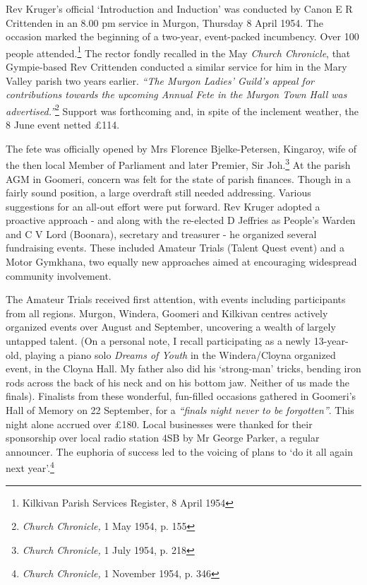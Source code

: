 Rev Kruger's official `Introduction and Induction' was conducted by Canon E R Crittenden in an 8.00 pm service in Murgon, Thursday 8 April 1954. The occasion marked the beginning of a two-year, event-packed incumbency. Over 100 people attended.\footnote{Kilkivan Parish Services Register, 8 April 1954} The rector fondly recalled in the May \emph{Church Chronicle}, that Gympie-based Rev Crittenden conducted a similar service for him in the Mary Valley parish two years earlier. \emph{``The Murgon Ladies' Guild's appeal for contributions towards the upcoming Annual Fete in the Murgon Town Hall was advertised.''}\footnote{\emph{Church Chronicle,} 1 May 1954, p. 155} Support was forthcoming and, in spite of the inclement weather, the 8 June event netted \pounds114.


The fete was officially opened by Mrs Florence Bjelke-Petersen, Kingaroy, wife of the then local Member of Parliament and later Premier, Sir Joh.\footnote{\emph{Church Chronicle,} 1 July 1954, p. 218} At the parish AGM in Goomeri, concern was felt for the state of parish finances. Though in a fairly sound position, a large overdraft still needed addressing. Various suggestions for an all-out effort were put forward. Rev Kruger adopted a proactive approach - and along with the re-elected D Jeffries as People's Warden and C V Lord (Boonara), secretary and treasurer - he organized several fundraising events. These included Amateur Trials (Talent Quest event) and a Motor Gymkhana, two equally new approaches aimed at encouraging widespread community involvement.


The Amateur Trials received first attention, with events including participants from all regions. Murgon, Windera, Goomeri and Kilkivan centres actively organized events over August and September, uncovering a wealth of largely untapped talent. (On a personal note, I recall participating as a newly 13-year-old, playing a piano solo \emph{Dreams of Youth} in the Windera/Cloyna organized event, in the Cloyna Hall. My father also did his `strong-man' tricks, bending iron rods across the back of his neck and on his bottom jaw. Neither of us made the finals). Finalists from these wonderful, fun-filled occasions gathered in Goomeri's Hall of Memory on 22 September, for a \emph{``finals night never to be forgotten''}. This night alone accrued over \pounds180. Local businesses were thanked for their sponsorship over local radio station 4SB by Mr George Parker, a regular announcer. The euphoria of success led to the voicing of plans to `do it all again next year'.\footnote{\emph{Church Chronicle,} 1 November 1954, p. 346}


